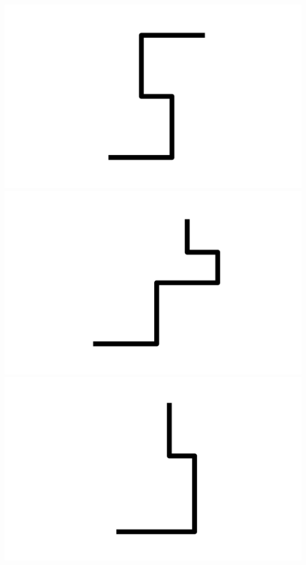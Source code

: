 \documentclass[]{report}
\begin{document}
\includegraphics[scale=.1]{pictures/21/state_cluster_shapes_469.pdf} 
\includegraphics[scale=.1]{pictures/21/state_cluster_shapes_470.pdf} 
\includegraphics[scale=.1]{pictures/21/state_cluster_shapes_471.pdf} 
\end{document}
